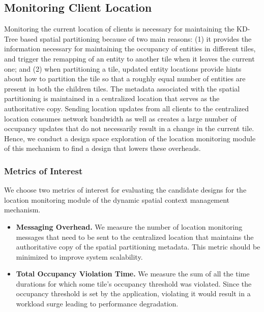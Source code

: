 \subsection{Monitoring Client Location}
Monitoring the current location of clients is necessary for maintaining the KD-Tree based spatial partitioning because of two main reasons: (1) it provides the information necessary for maintaining the occupancy of entities in different tiles, and trigger the remapping of an entity to another tile when it leaves the current one; and (2) when partitioning a tile, updated entity locations provide hints about how to partition the tile so that a roughly equal number of entities are present in both the children tiles.
The metadata associated with the spatial partitioning is maintained in a centralized location that serves as the authoritative copy. Sending location updates from all clients to the centralized location consumes network bandwidth as well as creates a large number of occupancy updates that do not necessarily result in a change in the current tile. Hence, we conduct a design space exploration of the location monitoring module of this mechanism to find a design that lowers these overheads.
\subsubsection{Metrics of Interest}
We choose two metrics of interest for evaluating the candidate designs for the location monitoring module of the dynamic spatial context management mechanism. 
\begin{itemize}
\item \textbf{Messaging Overhead. } We measure the number of location monitoring messages that need to be sent to the centralized location that maintains the authoritative copy of the spatial partitioning metadata. This metric should be minimized to improve system scalability. 
\item \textbf{Total Occupancy Violation Time. } We measure the sum of all the time durations for which some tile's occupancy threshold was violated. Since the occupancy threshold is set by the application, violating it would result in a workload surge leading to performance degradation.
\end{itemize}

